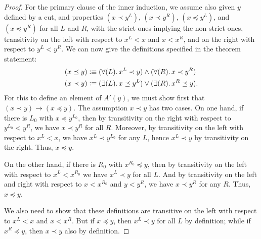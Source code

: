 \begin{proof}
  For the primary clause of the inner induction, we assume also given $y$ defined by a cut, and properties $(x\prec y^L)$, $(x\prec y^R)$, $(x\preceq y^L)$, and $(x\preceq y^R)$ for all $L$ and $R$, with the strict ones implying the non-strict ones, transitivity on the left with respect to $x^L<x$ and $x<x^R$, and on the right with respect to $y^L<y^R$.
  We can now give the definitions specified in the theorem statement:
  \begin{align}
    (x\preceq y) &\defeq
    (\fall{L} x^L\prec y) \land (\fall{R} x\prec y^R)\label{eq:NO-preceq-def}\\
    (x\prec y) &\defeq
    (\exis{L} x\preceq y^L) \lor (\exis{R} x^R \preceq y).\label{eq:NO-prec-def}
  \end{align}
  For this to define an element of $A'(y)$, we must show first that $(x\prec y) \to (x\preceq y)$.
  The assumption $x\prec y$ has two cases.
  On one hand, if there is $L_0$ with $x\preceq y^{L_0}$, then by transitivity on the right with respect to $y^{L_0}<y^R$, we have $x\prec y^R$ for all $R$.
  Moreover, by transitivity on the left with respect to $x^L<x$, we have $x^L \prec y^{L_0}$ for any $L$, hence $x^L\prec y$ by transitivity on the right.
  Thus, $x\preceq y$.

  On the other hand, if there is $R_0$ with $x^{R_0}\preceq y$, then by transitivity on the left with respect to $x^L<x^{R_0}$ we have $x^L \prec y$ for all $L$.
  And by transitivity on the left and right with respect to $x<x^{R_0}$ and $y<y^R$, we have $x\prec y^R$ for any $R$.
  Thus, $x\preceq y$.

  We also need to show that these definitions are transitive on the left with respect to $x^L<x$ and $x<x^R$.
  But if $x\preceq y$, then $x^L\prec y$ for all $L$ by definition; while if $x^R\preceq y$, then $x\prec y$ also by definition.


\end{proof}
